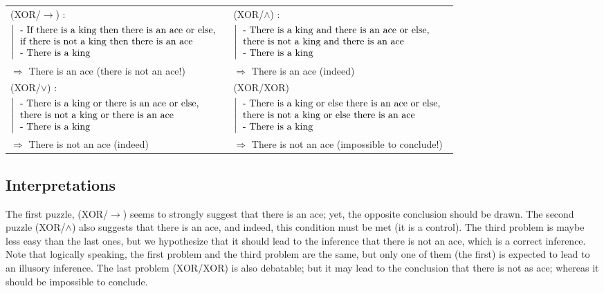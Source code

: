 \documentclass[french]{article}
\begin{document}
\begin{tabular}{ll}
	(XOR/$\rightarrow$) : & (XOR/$\wedge$) : \\
	$\left |
	\begin{tabular}{l}
	- If there is a king then there is an ace or else,\\
	if there is not a king then there is an ace\\
	- There is a king\\
	\end{tabular}\right.$ &
	$\left |
	\begin{tabular}{l}
		- There is a king and there is an ace or else,\\
		there is not a king and there is an ace\\
		- There is a king\\
	\end{tabular}\right.$ \\
	$\Longrightarrow$ There is an ace (there is not an ace!)
	&
	$\Longrightarrow$ There is an ace (indeed) \vspace{2mm} \\ 
	
	(XOR/$\vee$) : & (XOR/XOR)\\
	$\left |
	\begin{tabular}{l}
	- There is a king or there is an ace or else,\\
	there is not a king or there is an ace\\
	- There is a king \\
	\end{tabular}\right.$
	&
	$\left |
	\begin{tabular}{l}
	- There is a king or else there is an ace or else,\\
	there is not a king or else there is an ace\\
	- There is a king \\
	\end{tabular}\right.$ \\
	$\Longrightarrow$ There is not an ace (indeed) &
	$\Longrightarrow$ There is not an ace (impossible to conclude!)\\
\end{tabular}



\subsection{Interpretations}
The first puzzle, (XOR/$\rightarrow$) seems to strongly suggest that there is an ace; yet, the opposite conclusion should be drawn. The second puzzle (XOR/$\wedge$) also suggests that there is an ace, and  indeed, this condition must be met (it is a control). The third problem is maybe less easy than the last ones, but we hypothesize that it should lead to the inference that there is not an ace, which is a correct inference. Note that logically speaking, the first problem and the third problem are the same, but only one of them (the first) is expected to lead to an illusory inference. The last problem (XOR/XOR) is also debatable; but it may lead to the conclusion that there is not as ace; whereas it should be impossible to conclude.
\end{document}

